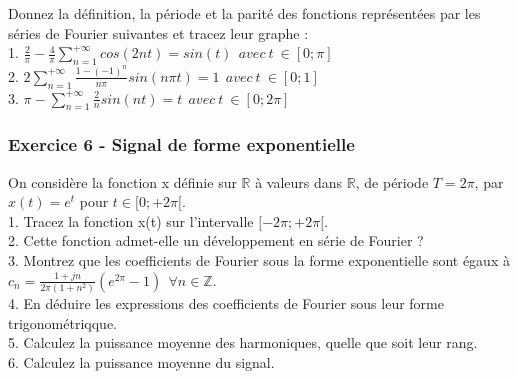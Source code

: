 \documentclass[11pt]{report}
\begin{document}
	Donnez la définition, la période et la parité des fonctions représentées par les séries de Fourier suivantes et tracez leur graphe :\\
	
	1. $	\frac{2}{\pi}-\frac{4}{\pi}\sum_{n=1}^{+\infty}cos(2nt)=sin(t)~~avec~t~\in[0;\pi]$\\
	
	2. $	2\sum_{n=1}^{+\infty}\frac{1-(-1)^{n}}{n \pi}sin(n \pi t)=1~~avec~t~\in[0;1]$ \\
	
	3. $	\pi-\sum_{n=1}^{+\infty}\frac{2}{n}sin(nt)=t~~avec~t~\in[0;2\pi]$ \\
	
	
	\subsubsection{Exercice 6 - Signal de forme exponentielle}
	On considère la fonction x définie sur $\mathbb{R}$ à valeurs dans $\mathbb{R}$, de période $T=2\pi$, par $x(t)=e^{t}$ pour $t\in [0;+2\pi[$.\\
	
	1. Tracez la fonction x(t) sur l'intervalle $[-2\pi;+2\pi[$.\\
	
	2. Cette fonction admet-elle un développement en série de Fourier ?\\
	
	3. Montrez que les coefficients de Fourier sous la forme exponentielle sont égaux à $c_{n}=\frac{1+jn}{2\pi(1+n^{2})}(e^{2\pi}-1)~~\forall n \in \mathbb{Z}$.\\
	
	4. En déduire les expressions des coefficients de Fourier sous leur forme trigonométriqque.\\
	
	5. Calculez la puissance moyenne des harmoniques, quelle que soit leur rang.\\
	
	6. Calculez la puissance moyenne du signal.\\
	
	
	
	
\end{document}
